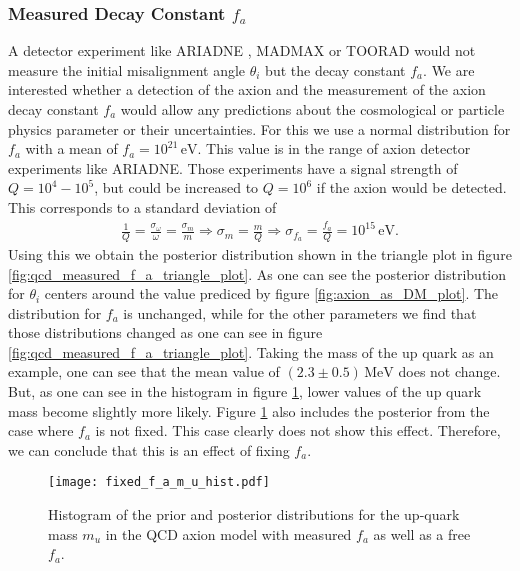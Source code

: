 \documentclass[twoside,a4paper, 12pt]{article}
\numberwithin{equation}{section}
\begin{document}
\subsubsection{Measured Decay Constant $f_a$}
A detector experiment like ARIADNE \cite{ARIADNE}, MADMAX \cite{MADMAX} or TOORAD \cite{TOORAD} would not measure the initial misalignment angle $\theta_i$ but the decay constant $f_a$.
We are interested whether a detection of the axion and the measurement of the axion decay constant $f_a$ would allow
any predictions about the cosmological or particle physics parameter or their uncertainties.
For this we use a normal distribution for $f_a$ with a mean of $f_a = 10^{21} \, \mathrm{eV}$. This value is in the range of axion detector experiments
like ARIADNE. Those experiments have a signal strength of $Q = 10^4 - 10^5$, but could be 
increased to $Q = 10^6$ if the axion would be detected. 
This corresponds to a standard deviation of
\begin{align*}
    \frac{1}{Q} = \frac{\sigma_\omega}{\omega}
    = \frac{\sigma_m}{m} \Rightarrow
    \sigma_m = \frac{m}{Q} \Rightarrow
    \sigma_{f_a} = \frac{f_a}{Q} = 10^{15} \, \mathrm{eV}.
\end{align*}
Using this we obtain the posterior distribution shown in the triangle plot in figure \ref{fig:qcd_measured_f_a_triangle_plot}.
As one can see the posterior distribution for $\theta_i$ centers around the value prediced by figure \ref{fig:axion_as_DM_plot}.
The distribution for $f_a$ is unchanged,
while for the other parameters we find that those distributions changed as one can see in figure
\ref{fig:qcd_measured_f_a_triangle_plot}.
Taking the mass of the up quark as an example, one can
see that the mean value of $(2.3 \pm 0.5) \, \mathrm{MeV}$
does not change.
But, as one can see in the histogram in figure \ref{fig:fixed_f_a_m_u_hist}, lower values of
the up quark mass become slightly more likely.
Figure \ref{fig:fixed_f_a_m_u_hist} also includes 
the posterior from the case where
$f_a$ is not fixed. This case clearly does not 
show this effect. Therefore, we can conclude that
this is an effect of fixing $f_a$.
\begin{figure}[H]
    \centering
    \texttt{[image: fixed\_f\_a\_m\_u\_hist.pdf]}
    \caption{Histogram of the prior and posterior distributions for the up-quark mass $m_u$
    in the QCD axion model with measured $f_a$ as well as
    a free $f_a$.
    }
    \label{fig:fixed_f_a_m_u_hist}
\end{figure}
\end{document}
